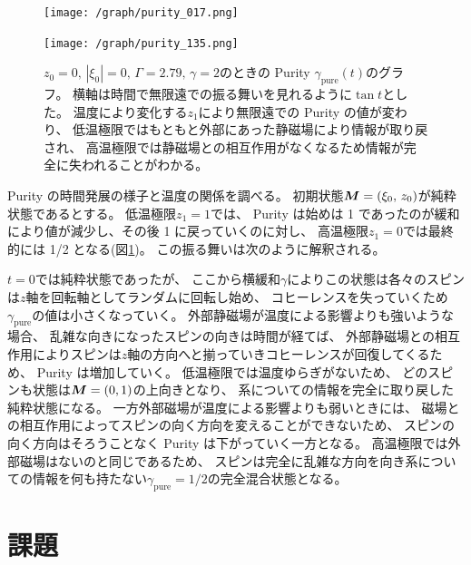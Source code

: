 \documentclass[11pt,dvipdfmx,a4paper]{jsarticle}
\begin{document}
\begin{figure}[htb]
	\centering
	\begin{minipage}[t]{0.48\columnwidth}
		\centering
		\texttt{[image: /graph/purity\_017.png]}
	\end{minipage}
	\hfill
	\begin{minipage}[t]{0.48\columnwidth}
		\centering
		\texttt{[image: /graph/purity\_135.png]}
	\end{minipage}
	\caption{\(z_0 = 0,\, |\xi_0|=0,\,\Gamma=2.79,\,\gamma=2\)のときの
	 Purity \(\gamma_{\text{pure}}(t)\)のグラフ。
	 横軸は時間で無限遠での振る舞いを見れるように\(\tan t\)とした。
	 温度により変化する\(z_{1}\)により無限遠での Purity の値が変わり、
	 低温極限ではもともと外部にあった静磁場により情報が取り戻され、
	 高温極限では静磁場との相互作用がなくなるため情報が完全に失われることがわかる。}
	 \label{graph:purity}
\end{figure}

Purity の時間発展の様子と温度の関係を調べる。
初期状態\(\vb*{M}=(\xi_0,\,z_0)\)が純粋状態であるとする。
低温極限\(z_{1}=1\)では、
Purity は始めは 1 であったのが緩和により値が減少し、その後 1 に戻っていくのに対し、
高温極限\(z_{1}=0\)では最終的には 1/2 となる(図\ref{graph:purity})。
この振る舞いは次のように解釈される。

\(t=0\)では純粋状態であったが、
ここから横緩和\(\gamma\)によりこの状態は各々のスピンは\(z\)軸を回転軸としてランダムに回転し始め、
コヒーレンスを失っていくため\(\gamma_{\text{pure}}\)の値は小さくなっていく。
外部静磁場が温度による影響よりも強いような場合、
乱雑な向きになったスピンの向きは時間が経てば、
外部静磁場との相互作用によりスピンは\(z\)軸の方向へと揃っていきコヒーレンスが回復してくるため、
Purity は増加していく。
低温極限では温度ゆらぎがないため、
どのスピンも状態は\(\vb*{M}=(0,1)\)の上向きとなり、
系についての情報を完全に取り戻した純粋状態になる。
一方外部磁場が温度による影響よりも弱いときには、
磁場との相互作用によってスピンの向く方向を変えることができないため、
スピンの向く方向はそろうことなく Purity は下がっていく一方となる。
高温極限では外部磁場はないのと同じであるため、
スピンは完全に乱雑な方向を向き系についての情報を何も持たない\(\gamma_{\text{pure}}=1/2\)の完全混合状態となる。

\section{課題}
\end{document}

